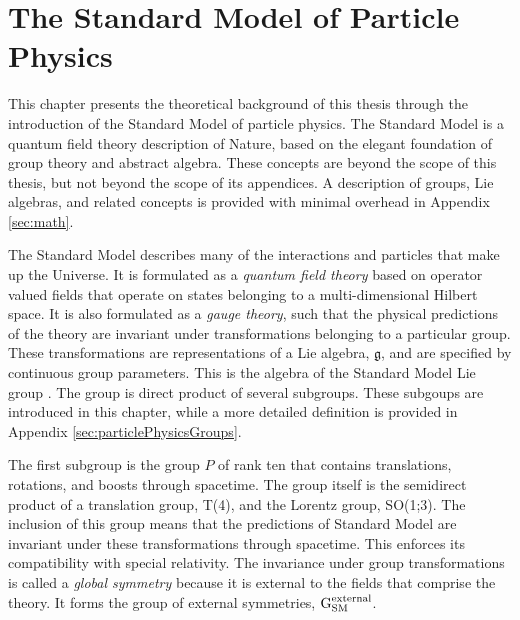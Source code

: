 \chapter{The Standard Model of Particle Physics}\label{sec:theory}

This chapter presents the theoretical background of this thesis through the introduction of the Standard Model of particle physics.
The Standard Model is a quantum field theory description of Nature, based on the elegant foundation of group theory and abstract algebra.
These concepts are beyond the scope of this thesis, but not beyond the scope of its appendices.
A description of groups, Lie algebras, and related concepts is provided with minimal overhead in Appendix \ref{sec:math}.

The Standard Model describes many of the interactions and particles that make up the Universe.
It is formulated as a \emph{quantum field theory} based on operator valued fields that operate on states belonging to a multi-dimensional Hilbert space.
It is also formulated as a \emph{gauge theory}, such that the physical predictions of the theory are invariant under transformations belonging to a particular group.
These transformations are representations of a Lie algebra, $\mathfrak{g}$, and are specified by continuous group parameters.
This is the algebra of the Standard Model Lie group \gsm.
The group \gsm is direct product of several subgroups.
These subgoups are introduced in this chapter, while a more detailed definition is provided in Appendix \ref{sec:particlePhysicsGroups}.

The first subgroup is the \poincare group $P$ of rank ten that contains translations, rotations, and boosts through spacetime.
The \poincare group itself is the semidirect product of a translation group, T(4), and the Lorentz group, SO(1;3).
The inclusion of this group means that the predictions of Standard Model are invariant under these transformations through spacetime.
This enforces its compatibility with special relativity.
The invariance under \poincare group transformations is called a \emph{global symmetry} because it is external to the fields that comprise the theory.
It forms the group of external symmetries, $\text{G}_\text{SM}^\text{external}$.

